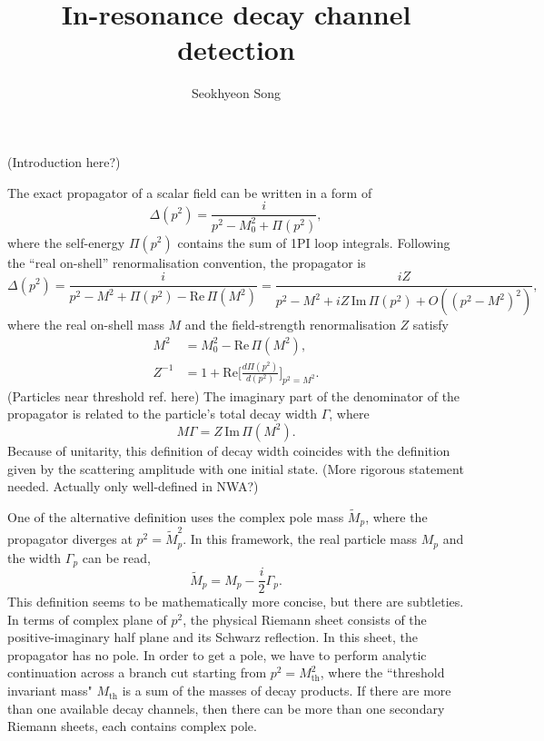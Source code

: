 \documentclass[11pt]{article}
\theoremstyle{definition}
\theoremstyle{remark}
\begin{document}
	\title{In-resonance decay channel detection}
	\author{Seokhyeon Song}
	\maketitle
	
	(Introduction here?)
	
	The exact propagator of a scalar field can be written in a form of
	\[\Delta(p^{2})=\frac{i}{p^{2}-M_{0}^{2}+\Pi(p^{2})},\]
	where the self-energy $\Pi(p^{2})$ contains the sum of 1PI loop integrals.
	Following the ``real on-shell'' renormalisation convention, the propagator is
	\[\Delta(p^{2})=\frac{i}{p^{2}-M^{2}+\Pi(p^{2})-\mathrm{Re}\,\Pi(M^{2})}=\frac{iZ}{p^{2}-M^{2}+iZ\,\mathrm{Im}\,\Pi(p^{2})+O((p^{2}-M^{2})^{2})},\]
	where the real on-shell mass $M$ and the field-strength renormalisation $Z$ satisfy
	\begin{align*}
		M^{2}&=M_{0}^{2}-\mathrm{Re}\,\Pi(M^{2}),\\
		Z^{-1}&=1+\mathrm{Re}\bigg[\frac{d\Pi(p^{2})}{d(p^{2})}\bigg]_{p^{2}=M^{2}}.
	\end{align*}
	(Particles near threshold ref. here)
	The imaginary part of the denominator of the propagator is related to the particle's total decay width $\Gamma$, where
	\[M\Gamma=Z\,\mathrm{Im}\,\Pi(M^{2}).\]
	Because of unitarity, this definition of decay width coincides with the definition given by the scattering amplitude with one initial state. (More rigorous statement needed. Actually only well-defined in NWA?)
	
	One of the alternative definition uses the complex pole mass $\tilde{M}_{p}$, where the propagator diverges at $p^{2}=\tilde{M}_{p}^{2}$.
	In this framework, the real particle mass $M_{p}$ and the width $\Gamma_{p}$ can be read,
	\[\tilde{M}_{p}=M_{p}-\frac{i}{2}\Gamma_{p}.\]
	This definition seems to be mathematically more concise, but there are subtleties.
	In terms of complex plane of $p^{2}$, the physical Riemann sheet consists of the positive-imaginary half plane and its Schwarz reflection.
	In this sheet, the propagator has no pole.
	In order to get a pole, we have to perform analytic continuation across a branch cut starting from $p^{2}=M_{\mathrm{th}}^{2}$, where the ``threshold invariant mass" $M_{\mathrm{th}}$ is a sum of the masses of decay products.
	If there are more than one available decay channels, then there can be more than one secondary Riemann sheets, each contains complex pole.
	
\end{document}
